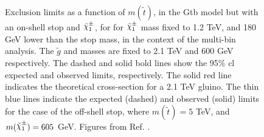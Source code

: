 \begin{figure}
  \centering
  \caption{Exclusion limits as a function of $m(\tilde{t})$, in the Gtb model but with an on-shell stop and $\chinoonepm$, 
  for   
  for $\chinoonepm$ mass fixed to 1.2 TeV, and   180 GeV lower than the stop mass,
  in the context of the multi-bin analysis. The $\tilde{g}$ and \ninoone masses are fixed to 2.1 TeV and 600 GeV respectively.   
  The dashed and solid bold lines  show the 95\% \gls{cl} expected and observed limits, respectively.    
  The solid red line indicates the theoretical cross-section for a 2.1 TeV gluino. 
  The thin blue lines indicate the expected (dashed) and observed (solid) limits for the case of the off-shell stop, where $m(\tilde{t}) = 5$ TeV, and $m(\chinoonepm) = 605$ GeV.
  Figures from Ref. \cite{ATLAS-CONF-2018-041}.}
  \label{fig:limits_GtbOnshell}
\end{figure}




\clearpage 


